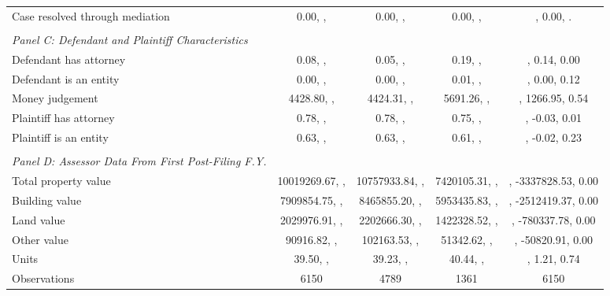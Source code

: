 \begin{table}[htbp]
\begin{tabular}{l*{4}{c}}
\hspace{0.25cm}Case resolved through mediation&    0.00, , &    0.00, , &    0.00, , &   , 0.00, .\\
\vspace{0.1em} \\ \emph{Panel C: Defendant and Plaintiff Characteristics}&            &            &            &            \\
\hspace{0.25cm}Defendant has attorney&    0.08, , &    0.05, , &    0.19, , &, 0.14, 0.00\\
\hspace{0.25cm}Defendant is an entity&    0.00, , &    0.00, , &    0.01, , &, 0.00, 0.12\\
\hspace{0.25cm}Money judgement& 4428.80, , & 4424.31, , & 5691.26, , &, 1266.95, 0.54\\
\hspace{0.25cm}Plaintiff has attorney&    0.78, , &    0.78, , &    0.75, , &, -0.03, 0.01\\
\hspace{0.25cm}Plaintiff is an entity&    0.63, , &    0.63, , &    0.61, , &, -0.02, 0.23\\
\vspace{0.1em} \\ \emph{Panel D: Assessor Data From First Post-Filing F.Y.}&            &            &            &            \\
\hspace{0.25cm}Total property value&10019269.67, , &10757933.84, , &7420105.31, , &, -3337828.53, 0.00\\
\hspace{0.25cm}Building value&7909854.75, , &8465855.20, , &5953435.83, , &, -2512419.37, 0.00\\
\hspace{0.25cm}Land value&2029976.91, , &2202666.30, , &1422328.52, , &, -780337.78, 0.00\\
\hspace{0.25cm}Other value&90916.82, , &102163.53, , &51342.62, , &, -50820.91, 0.00\\
\hspace{0.25cm}Units&   39.50, , &   39.23, , &   40.44, , &, 1.21, 0.74\\
\midrule
Observations        &        6150&        4789&        1361&        6150\\
\bottomrule
\end{tabular}
\end{table}
